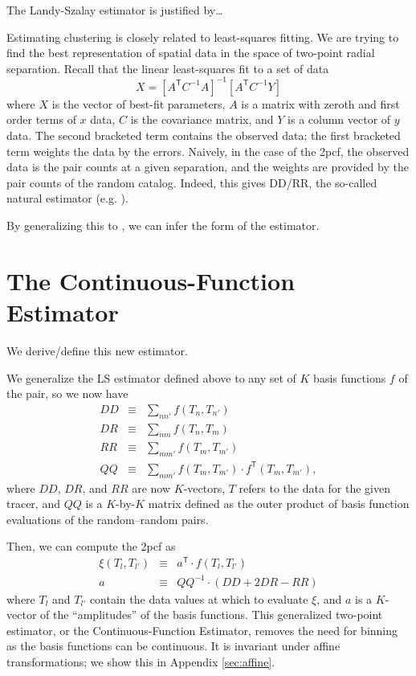 \documentclass[modern]{aastex62}
\newcommand{\cf}{2pcf\xspace} %
\newcommand{\Est}{The Continuous-Function Estimator\xspace}
\newcommand{\est}{the Continuous-Function Estimator\xspace}
\newcommand{\LS}{LS\xspace}
\newcommand{\inv}{^{-1}}
\newcommand{\T}{^{\mathsf{T}}}
\begin{document}
The Landy-Szalay estimator is justified by\ldots

Estimating clustering is closely related to least-squares fitting.
We are trying to find the best representation of spatial data in the space of two-point radial separation.
Recall that the linear least-squares fit to a set of data 
\begin{equation}
X = [A\T C\inv A]\inv [A\T C\inv Y]
\end{equation}
where $X$ is the vector of best-fit parameters, $A$ is a matrix with zeroth and first order terms of $x$ data, $C$ is the covariance matrix, and $Y$ is a column vector of $y$ data.
The second bracketed term contains the observed data; the first bracketed term weights the data by the errors.
Naively, in the case of the \cf, the observed data is the pair counts at a given separation, and the weights are provided by the pair counts of the random catalog.
Indeed, this gives DD/RR, the so-called natural estimator (e.g. \citealt{Kerscher2000}).

By generalizing this to , we can infer the form of the estimator.

\section{\Est} \label{sec:est}

We derive/define this new estimator.


We generalize the \LS estimator defined above to any set of $K$ basis functions $f$ of the pair, so we now have
\begin{eqnarray}\displaystyle
DD &\equiv& \sum_{n n'} f(T_n, T_{n'}) \\
DR &\equiv& \sum_{n m} f(T_n, T_{m}) \\
RR &\equiv& \sum_{m m'} f(T_m, T_{m'}) \\
QQ &\equiv& \sum_{m m'} f(T_m, T_{m'}) \cdot f\T(T_m, T_{m'}),
\end{eqnarray}
where $DD$, $DR$, and $RR$ are now $K$-vectors, $T$ refers to the data for the given tracer, and $QQ$ is a $K$-by-$K$ matrix defined as the outer product of basis function evaluations of the random--random pairs.

Then, we can compute the \cf as
\begin{eqnarray}\displaystyle
\xi(T_l, T_{l'}) &\equiv& a\T \cdot f(T_l, T_{l'}) \\
a &\equiv& QQ\inv \cdot (DD + 2DR - RR) 
\end{eqnarray}
where $T_l$ and $T_{l'}$ contain the data values at which to evaluate $\xi$, and $a$ is a $K$-vector of the ``amplitudes'' of the basis functions.
This generalized two-point estimator, or \est, removes the need for binning as the basis functions can be continuous.
It is invariant under affine transformations; we show this in Appendix \ref{sec:affine}.
\end{document}
